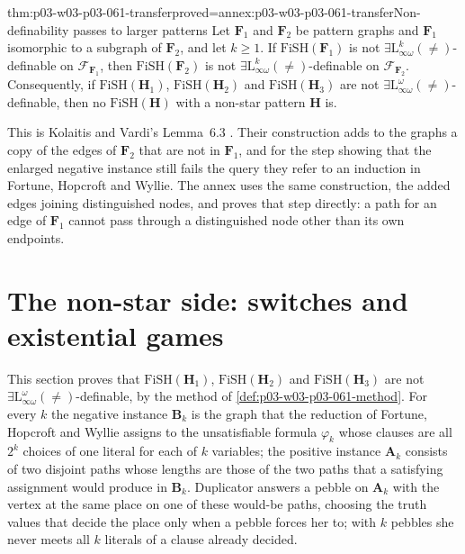 \begin{hbtheorem}{thm:p03-w03-p03-061-transfer}{proved=annex:p03-w03-p03-061-transfer}{Non-definability passes to larger patterns}
Let \(\mathbf F_1\) and \(\mathbf F_2\) be pattern graphs and \(\mathbf F_1\)
isomorphic to a subgraph of \(\mathbf F_2\), and let \(k\ge1\). If
\(\mathrm{FiSH}(\mathbf F_1)\) is not
\(\exists\mathrm L^k_{\infty\omega}(\neq)\)-definable on
\(\mathcal F_{\mathbf F_1}\), then \(\mathrm{FiSH}(\mathbf F_2)\) is not
\(\exists\mathrm L^k_{\infty\omega}(\neq)\)-definable on
\(\mathcal F_{\mathbf F_2}\). Consequently, if
\(\mathrm{FiSH}(\mathbf H_1)\), \(\mathrm{FiSH}(\mathbf H_2)\) and
\(\mathrm{FiSH}(\mathbf H_3)\) are not
\(\exists\mathrm L^\omega_{\infty\omega}(\neq)\)-definable, then no
\(\mathrm{FiSH}(\mathbf H)\) with a non-star pattern \(\mathbf H\) is.
\end{hbtheorem}

This is Kolaitis and Vardi's Lemma~6.3
\cite[Lemma~6.3, pp.~28--29]{KolaitisVardi1995DatalogManuscript}. Their
construction adds to the graphs a copy of the edges of \(\mathbf F_2\) that
are not in \(\mathbf F_1\), and for the step showing that the enlarged
negative instance still fails the query they refer to an induction in
Fortune, Hopcroft and Wyllie. The annex uses the same construction, the
added edges joining distinguished nodes, and proves that step directly:
a path for an edge of \(\mathbf F_1\) cannot pass through a distinguished
node other than its own endpoints.

\section{The non-star side: switches and existential games}
\label{sec:p03-w03-p03-061-switches}

This section proves that \(\mathrm{FiSH}(\mathbf H_1)\),
\(\mathrm{FiSH}(\mathbf H_2)\) and \(\mathrm{FiSH}(\mathbf H_3)\) are not
\(\exists\mathrm L^\omega_{\infty\omega}(\neq)\)-definable, by the method of
\cref{def:p03-w03-p03-061-method}. For every \(k\) the negative instance
\(\mathbf B_k\) is the graph that the reduction of Fortune, Hopcroft and
Wyllie assigns to the unsatisfiable formula \(\varphi_k\) whose clauses are
all \(2^k\) choices of one literal for each of \(k\) variables; the positive
instance \(\mathbf A_k\) consists of two disjoint paths whose lengths are those
of the two paths that a satisfying assignment would produce in
\(\mathbf B_k\). Duplicator answers a pebble on \(\mathbf A_k\) with the
vertex at the same place on one of these would-be paths, choosing the truth
values that decide the place only when a pebble forces her to; with \(k\)
pebbles she never meets all \(k\) literals of a clause already decided.

